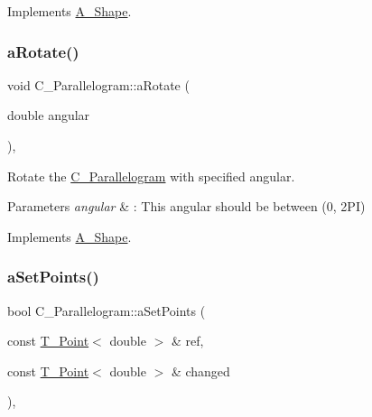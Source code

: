 Implements \hyperlink{classA__Shape_a892688cbbad3297e00e87cce0dbfc76d}{A\+\_\+\+Shape}.

\mbox{\label{classC__Parallelogram_a07b6dfae7100a409cdcf04d710ac9c3f}} 
\subsubsection{\texorpdfstring{a\+Rotate()}{aRotate()}}
{\footnotesize\ttfamily void C\+\_\+\+Parallelogram\+::a\+Rotate (\begin{DoxyParamCaption}\item[{double}]{angular }\end{DoxyParamCaption})\hspace{0.3cm}{\ttfamily [override]}, {\ttfamily [virtual]}}



Rotate the \hyperlink{classC__Parallelogram}{C\+\_\+\+Parallelogram} with specified angular. 


\begin{DoxyParams}{Parameters}
{\em angular} & \+: This angular should be between (0, 2\+PI) \\
\hline
\end{DoxyParams}


Implements \hyperlink{classA__Shape_a25b4e0c34cdb46da5382fe9c7467efaf}{A\+\_\+\+Shape}.

\mbox{\label{classC__Parallelogram_adfe1c40f2d33955617e3a535c548dfa0}} 
\subsubsection{\texorpdfstring{a\+Set\+Points()}{aSetPoints()}}
{\footnotesize\ttfamily bool C\+\_\+\+Parallelogram\+::a\+Set\+Points (\begin{DoxyParamCaption}\item[{const \hyperlink{classT__Point}{T\+\_\+\+Point}$<$ double $>$ \&}]{ref,  }\item[{const \hyperlink{classT__Point}{T\+\_\+\+Point}$<$ double $>$ \&}]{changed }\end{DoxyParamCaption})\hspace{0.3cm}{\ttfamily [override]}, {\ttfamily [virtual]}}



